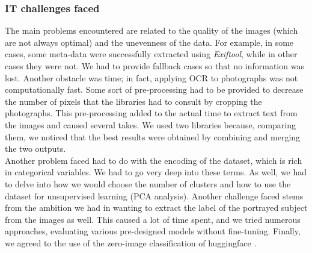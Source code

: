 \documentclass[12pt,a4paper,twoside]{article}
\begin{document}
\subsubsection{IT challenges faced}
The main problems encountered are related to the quality of the images (which are not always optimal) and the unevenness of the data. For example, in some cases, some meta-data were successfully extracted using \textit{Exiftool}, while in other cases they were not. We had to provide fallback cases so that no information was lost. Another obstacle was time; in fact, applying OCR to photographs was not computationally fast. Some sort of pre-processing had to be provided to decrease the number of pixels that the libraries had to consult by cropping the photographs. This pre-processing added to the actual time to extract text from the images and caused several takes. We used two libraries because, comparing them, we noticed that the best results were obtained by combining and merging the two outputs. \\ Another problem faced had to do with the encoding of the dataset, which is rich in categorical variables. We had to go very deep into these terms. As well, we had to delve into how we would choose the number of clusters and how to use the dataset for unsupervised learning (PCA analysis). Another challenge faced stems from the ambition we had in wanting to extract the label of the portrayed subject from the images as well. This caused a lot of time spent, and we tried numerous approaches, evaluating various pre-designed models without fine-tuning. Finally, we agreed to the use of the zero-image classification of huggingface \cite{huggingface}.
\end{document}
